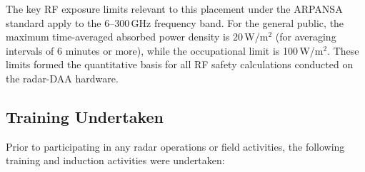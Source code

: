 The key RF exposure limits relevant to this placement under the ARPANSA standard apply to
the 6--300\,GHz frequency band. For the general public, the maximum time-averaged absorbed
power density is 20\,W/m$^2$ (for averaging intervals of 6 minutes or more), while the
occupational limit is 100\,W/m$^2$. These limits formed the quantitative basis for all RF
safety calculations conducted on the radar-DAA hardware.
 
\subsection*{Training Undertaken}
 
Prior to participating in any radar operations or field activities, the following training
and induction activities were undertaken:
 

